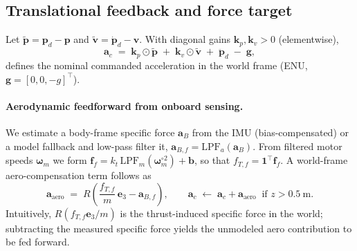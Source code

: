 \subsection{Translational feedback and force target}\label{sec:outer-force}
Let $\tilde{\mathbf{p}}=\mathbf{p}_d-\mathbf{p}$ and $\tilde{\mathbf{v}}=\dot{\mathbf{p}}_d-\mathbf{v}$.
With diagonal gains $\mathbf{k}_p,\mathbf{k}_v>0$ (elementwise),
\begin{equation}
\mathbf{a}_c \;=\; \mathbf{k}_p\odot\tilde{\mathbf{p}}
                  \;+\; \mathbf{k}_v\odot\tilde{\mathbf{v}}
                  \;+\; \ddot{\mathbf{p}}_d \;-\; \mathbf{g},
\label{eq:ac-nom}
\end{equation}
defines the nominal commanded acceleration in the world frame (ENU, $\mathbf{g}=[0,0,-g]^\top$).

\paragraph{Aerodynamic feedforward from onboard sensing.}
We estimate a body-frame specific force $\mathbf{a}_B$ from the IMU (bias-compensated)
or a model fallback and low-pass filter it, $\mathbf{a}_{B,f}=\mathrm{LPF}_a(\mathbf{a}_B)$.
From filtered motor speeds $\boldsymbol{\omega}_m$ we form
$\mathbf{f}_f = k_t\,\mathrm{LPF}_m(\boldsymbol{\omega}_m^{\circ 2})+\mathbf{b}$,
so that $f_{T,f}=\mathbf{1}^\top\mathbf{f}_f$.
A world-frame aero-compensation term follows as
\begin{equation}
\mathbf{a}_{\text{aero}} \;=\; R\!\left(\frac{f_{T,f}}{m}\,\mathbf{e}_3 - \mathbf{a}_{B,f}\right),
\qquad
\mathbf{a}_c \;\leftarrow\; \mathbf{a}_c + \mathbf{a}_{\text{aero}}
\;\;\text{if } z>0.5~\mathrm{m}.
\label{eq:aero-comp-outer}
\end{equation}
Intuitively, $R(f_{T,f}\mathbf{e}_3/m)$ is the thrust-induced specific force in the world;
subtracting the measured specific force yields the unmodeled aero contribution to be
fed forward.

